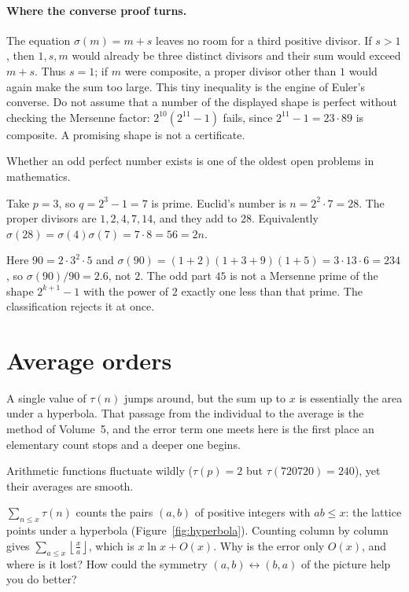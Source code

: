 \paragraph{Where the converse proof turns.}
The equation $\sigma(m)=m+s$ leaves no room for a third positive divisor.
If $s>1$, then $1,s,m$ would already be three distinct divisors and their sum
would exceed $m+s$. Thus $s=1$; if $m$ were composite, a proper divisor other
than $1$ would again make the sum too large. This tiny inequality is the
engine of Euler's converse. Do not assume that a number of the displayed shape
is perfect without checking the Mersenne factor: $2^{10}(2^{11}-1)$ fails,
since $2^{11}-1=23\cdot89$ is composite. A promising shape is not a certificate.

Whether an odd perfect number exists is one of the oldest open problems in mathematics.

\begin{examplex}
Take $p=3$, so $q=2^3-1=7$ is prime. Euclid's number is $n=2^{2}\cdot 7=28$.
The proper divisors are $1,2,4,7,14$, and they add to $28$.
Equivalently $\sigma(28)=\sigma(4)\sigma(7)=7\cdot 8=56=2n$.
\end{examplex}

\begin{examplex}
Here $90=2\cdot 3^2\cdot 5$ and $\sigma(90)=(1+2)(1+3+9)(1+5)=3\cdot 13\cdot 6=234$, so $\sigma(90)/90=2.6$, not $2$.
The odd part $45$ is not a Mersenne prime of the shape $2^{k+1}-1$ with the power of $2$ exactly one less than that prime. The classification rejects it at once.
\end{examplex}

\section{Average orders}

A single value of $\tau(n)$ jumps around, but the sum up to $x$ is essentially the area under a hyperbola. That passage from the individual to the average is the method of Volume~5, and the error term one meets here is the first place an elementary count stops and a deeper one begins.

Arithmetic functions fluctuate wildly ($\tau(p)=2$ but $\tau(720720)=240$), yet their averages are smooth.

\begin{think}
$\sum_{n\le x}\tau(n)$ counts the pairs $(a,b)$ of positive integers with $ab\le x$: the lattice points under a hyperbola (Figure~\ref{fig:hyperbola}). Counting column by column gives $\sum_{a\le x}\left\lfloor\frac xa\right\rfloor$, which is $x\ln x+O(x)$. Why is the error only $O(x)$, and where is it lost? How could the symmetry $(a,b)\leftrightarrow(b,a)$ of the picture help you do better?
\end{think}

